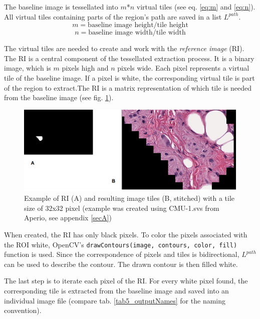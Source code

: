 The baseline image is tessellated into $m$*$n$ virtual tiles (see eq. \ref{eq:m} and \ref{eq:n}). All virtual tiles containing parts of the region's path are saved in a list $L^{path}$.
\begin{equation}\label{eq:m}
	m = \text{baseline image height} / \text{tile height}
\end{equation}
\begin{equation}\label{eq:n}
	n = \text{baseline image width} / \text{tile width}
\end{equation}

The virtual tiles are needed to create and work with the \emph{reference image} (RI). The RI is a central component of the tessellated extraction process. It is a binary image, which is $m$ pixels high and $n$ pixels wide. Each pixel represents a virtual tile of the baseline image. If a pixel is white, the corresponding virtual tile is part of the region to extract.The RI is a matrix representation of which tile is needed from the baseline image (see fig. \ref{fig5_riExample}).

\begin{figure}[!h]
	\begin{center}
		\includegraphics[scale=0.35]{img/RI_example.png}
		\caption{Example of RI (A) and resulting image tiles (B, stitched) with a tile size of 32x32 pixel (example was created using CMU-1.svs from Aperio, see appendix \ref{secA})}
		\label{fig5_riExample}
	\end{center}
\end{figure}

When created, the RI has only black pixels. To color the pixels associated with the ROI white,  OpenCV's \texttt{drawContours(image, contours, color, fill)} function is used. Since the correspondence of pixels and tiles is bidirectional, $L^{path}$ can be used to describe the contour. The drawn contour is then filled white.

The last step is to iterate each pixel of the RI. For every white pixel found, the corresponding tile is extracted from the baseline image and saved into an individual image file (compare tab. \ref{tab5_outputNames} for the naming convention).


